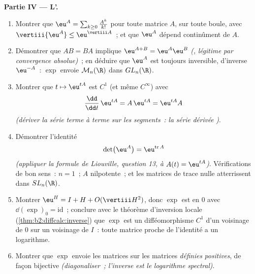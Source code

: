 \begin{problem}
\medskip
\noindent\textbf{Partie IV --- L'.}
\begin{enumerate}[resume]
  \item Montrer que $\eu^A = \sum_{k\geq0}\frac{A^k}{k!}$
          pour toute matrice $A$,  sur
        toute boule, avec $\vertiii{\eu^A} \leq
        \eu^{\vertiii A}$~; et que $\eu^A$ dépend
        continûment de $A$.
  \item Démontrer que $AB = BA$ implique $\eu^{A+B} =
        \eu^A\eu^B$ \emph{(, légitime par
        convergence absolue)}~; en déduire que $\eu^A$ est toujours
        inversible, d'inverse $\eu^{-A}$~: $\exp$ envoie
        $\mathcal M_n(\R)$ dans $GL_n(\R)$.
  \item Montrer que $t \mapsto \eu^{tA}$ est $C^1$ (et même
        $C^\infty$) avec
        \[
        \frac{\dd}{\dd t}\,\eu^{tA} = A\,\eu^{tA} =
        \eu^{tA}A
        \]
        \emph{(dériver la série terme à terme sur les segments~: la
        série dérivée  )}.
  \item Démontrer l'identité
        \[
        \det\bigl(\eu^{A}\bigr) = \eu^{\operatorname{tr}A}
        \]
        \emph{(appliquer la formule de Liouville, question 13, à
        $A(t) = \eu^{tA}$)}. Vérifications de bon sens~: $n = 1$~;
        $A$ nilpotente~; et les matrices de trace nulle atterrissent
        dans $SL_n(\R)$.
  \item Montrer $\eu^H = I + H + O(\vertiii H^2)$, donc $\exp$ est
         en $0$ avec $\dd(\exp)_0 =
        \mathrm{id}$~; conclure avec le théorème d'inversion
        locale (\cref{thm:b2:diffcalc:inverse}) que $\exp$
        est un difféomorphisme $C^1$ d'un voisinage de $0$
        sur un voisinage de $I$~: toute matrice proche de
        l'identité a un logarithme.
  \item Montrer que $\exp$ envoie les matrices  sur les
        matrices  \emph{définies positives}, de façon
        bijective \emph{(diagonaliser~; l'inverse est le logarithme
        spectral)}.
\end{enumerate}


\end{problem}
